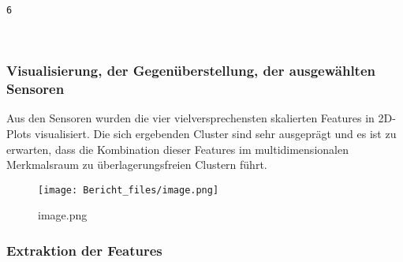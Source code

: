 \documentclass[11pt]{article}
\begin{document}
    \begin{Verbatim}[commandchars=\\\{\}]
6
    \end{Verbatim}

    \begin{center}
    \end{center}
    { \hspace*{\fill} \\}
    
    \hypertarget{visualisierung-der-gegenuxfcberstellung-der-ausgewuxe4hlten-sensoren}{%
\subsubsection*{Visualisierung, der Gegenüberstellung, der ausgewählten
Sensoren}\label{visualisierung-der-gegenuxfcberstellung-der-ausgewuxe4hlten-sensoren}}

    Aus den Sensoren wurden die vier vielversprechensten skalierten Features
in 2D-Plots visualisiert. Die sich ergebenden Cluster sind sehr
ausgeprägt und es ist zu erwarten, dass die Kombination dieser Features
im multidimensionalen Merkmalsraum zu überlagerungsfreien Clustern
führt.

    \begin{figure}
\centering
\texttt{[image: Bericht\_files/image.png]}
\caption{image.png}
\end{figure}

    \hypertarget{extraktion-der-features}{%
\subsubsection*{Extraktion der Features}\label{extraktion-der-features}}
\end{document}
